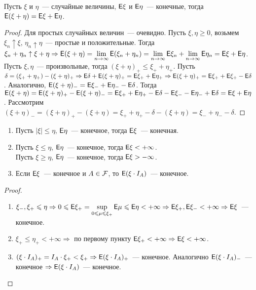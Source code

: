 \begin{property}[Аддитивность]
	Пусть $\xi$ и $\eta$~--- случайные величины, $\mathsf{E}\xi$ и $\mathsf{E}\eta$~--- конечные, тогда $\mathsf{E}(\xi + \eta) = \mathsf{E}\xi + \mathsf{E}\eta$.
	\begin{proof}
		Для простых случайных величин~--- очевидно. Пусть $\xi, \eta \geqslant 0$, возьмем $\xi_n \uparrow \xi$, $\eta_n \uparrow \eta$~--- простые и положительные. Тогда $\xi_n + \eta_n \uparrow \xi + \eta \Rightarrow \mathsf{E}(\xi + \eta) = \lim\limits_{n \rightarrow \infty}\mathsf{E}(\xi_n + \eta_n) = \lim\limits_{n \rightarrow \infty}\mathsf{E} \xi_n + \lim\limits_{n \rightarrow \infty} \mathsf{E}\eta_n = \mathsf{E}\xi + \mathsf{E}\eta$. Пусть $\xi, \eta$~--- произвольные, тогда $(\xi + \eta)_+ \leqslant \xi_+ + \eta_+$. Пусть $\delta = (\xi_+ + \eta_+) - (\xi + \eta)_+ \Rightarrow \mathsf{E}\delta + \mathsf{E}(\xi + \eta)_+ = \mathsf{E}\xi_+ + \mathsf{E}\eta_+ \Rightarrow \mathsf{E}(\xi + \eta)_+ = \mathsf{E}\xi_+ + \mathsf{E}\xi_+ - \mathsf{E}\delta$. Аналогично, $\mathsf{E}(\xi + \eta)_- = \mathsf{E}\xi_- + \mathsf{E}\eta_- - \mathsf{E}\delta$. Тогда $\mathsf{E}(\xi + \eta) = \mathsf{E}(\xi + \eta)_+ - \mathsf{E}(\xi + \eta)_- = \mathsf{E}\xi_+ + \mathsf{E}\eta_+ - \mathsf{E}\delta - \mathsf{E}\xi_- - \mathsf{E}\eta_- + \mathsf{E} \delta = \mathsf{E}\xi + \mathsf{E}\eta$. Рассмотрим $(\xi + \eta)_- = (\xi + \eta)_+ - (\xi + \eta) = \xi_+ + \eta_+ - \delta - (\xi + \eta) = \xi_- + \eta_- - \delta$.
	\end{proof}
\end{property}

\begin{property}
	\begin{enumerate}
		\item Пусть $|\xi| \leqslant \eta$, $\mathsf{E}\eta$~--- конечное, тогда $\mathsf{E} \xi$~--- конечная.
		\item Пусть $\xi \leqslant \eta$, $\mathsf{E}\eta$~--- конечное, тогда $\mathsf{E}\xi < + \infty$. \\
		Пусть $\xi \geqslant \eta$, $\mathsf{E}\eta$~--- конечное, тогда $\mathsf{E}\xi > - \infty$.
		\item Если $\mathsf{E}\xi$~--- конечное и $A \in \mathcal{F}$, то $\mathsf{E}(\xi\cdot I_A)$~--- конечное.
	\end{enumerate}
	\begin{proof}
		\begin{enumerate}
			\item $\xi_-, \xi_+ \leqslant \eta \Rightarrow 0 \leqslant \mathsf{E}\xi_+ = \sup\limits_{0 \leqslant \mu \leqslant \xi_+}\mathsf{E}\mu \leqslant \mathsf{E}\eta < +\infty \Rightarrow \mathsf{E}\xi_+, \mathsf{E}\xi_- < +\infty \Rightarrow \mathsf{E}\xi$~--- конечное.
			\item $\xi_+ \leqslant \eta_+ < +\infty \Rightarrow$ по первому пункту $\mathsf{E}\xi_+ < +\infty \Rightarrow \mathsf{E}\xi < +\infty$.
			\item $(\xi\cdot I_A)_+ = I_A\cdot\xi_+ < \xi_+ \Rightarrow \mathsf{E}(\xi\cdot I_A)_+$~--- конечное. Аналогично $\mathsf{E}(\xi\cdot I_A)_-$~--- конечное $\Rightarrow \mathsf{E}(\xi\cdot I_A)$~--- конечное.
		\end{enumerate}
	\end{proof}
\end{property}

